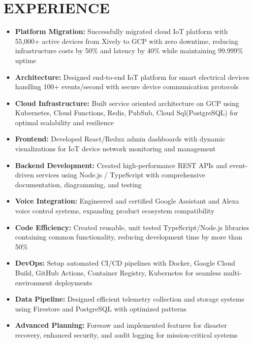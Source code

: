 \documentclass{fullstackdeveloper-ats}
\begin{document}
\section{EXPERIENCE}


\begin{itemize}
    \item \textbf{Platform Migration:} Successfully migrated cloud IoT platform with 55,000+ active devices from Xively to GCP with zero downtime, reducing infrastructure costs by 50\% and latency by 40\% while maintaining 99.999\% uptime
    \item \textbf{Architecture:} Designed end-to-end IoT platform for smart electrical devices handling 100+ events/second with secure device communication protocols
    \item \textbf{Cloud Infrastructure:} Built service oriented architecture on GCP using Kubernetes, Cloud Functions, Redis, PubSub, Cloud Sql(PostgreSQL) for optimal scalability and resilience
    \item \textbf{Frontend:} Developed React/Redux admin dashboards with dynamic visualizations for IoT device network monitoring and management
    \item \textbf{Backend Development:} Created high-performance REST APIs and event-driven services using Node.js / TypeScript with comprehensive documentation, diagramming, and testing
    \item \textbf{Voice Integration:} Engineered and certified Google Assistant and Alexa voice control systems, expanding product ecosystem compatibility
    \item \textbf{Code Efficiency:} Created reusable, unit tested TypeScript/Node.js libraries containing common functionality, reducing development time by more than 50\%
    \item \textbf{DevOps:} Setup automated CI/CD pipelines with Docker, Google Cloud Build, GitHub Actions, Container Registry, Kubernetes for seamless multi-environment deployments
    \item \textbf{Data Pipeline:} Designed efficient telemetry collection and storage systems using Firestore and PostgreSQL with optimized patterns
    \item \textbf{Advanced Planning:} Foresaw and implemented features for disaster recovery, enhanced security, and audit logging for mission-critical systems

\end{itemize}
\end{document}
